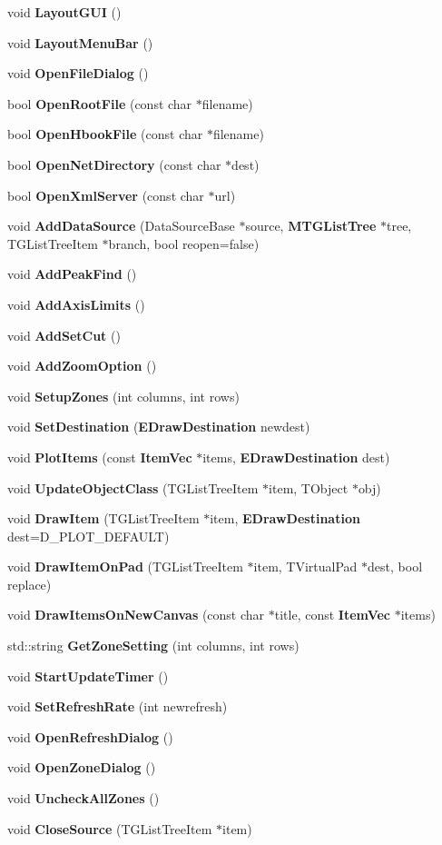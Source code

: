 \begin{DoxyCompactItemize}
\item 
void {\bf LayoutGUI} ()
\item 
void {\bf LayoutMenuBar} ()
\item 
void {\bf OpenFileDialog} ()
\item 
bool {\bf OpenRootFile} (const char $\ast$filename)
\item 
bool {\bf OpenHbookFile} (const char $\ast$filename)
\item 
bool {\bf OpenNetDirectory} (const char $\ast$dest)
\item 
bool {\bf OpenXmlServer} (const char $\ast$url)
\item 
void {\bf AddDataSource} (DataSourceBase $\ast$source, {\bf MTGListTree} $\ast$tree, TGListTreeItem $\ast$branch, bool reopen=false)
\item 
void {\bf AddPeakFind} ()
\item 
void {\bf AddAxisLimits} ()
\item 
void {\bf AddSetCut} ()
\item 
void {\bf AddZoomOption} ()
\item 
void {\bf SetupZones} (int columns, int rows)
\item 
void {\bf SetDestination} ({\bf EDrawDestination} newdest)
\item 
void {\bf PlotItems} (const {\bf ItemVec} $\ast$items, {\bf EDrawDestination} dest)
\item 
void {\bf UpdateObjectClass} (TGListTreeItem $\ast$item, TObject $\ast$obj)
\item 
void {\bf DrawItem} (TGListTreeItem $\ast$item, {\bf EDrawDestination} dest=D\_\-PLOT\_\-DEFAULT)
\item 
void {\bf DrawItemOnPad} (TGListTreeItem $\ast$item, TVirtualPad $\ast$dest, bool replace)
\item 
void {\bf DrawItemsOnNewCanvas} (const char $\ast$title, const {\bf ItemVec} $\ast$items)
\item 
std::string {\bf GetZoneSetting} (int columns, int rows)
\item 
void {\bf StartUpdateTimer} ()
\item 
void {\bf SetRefreshRate} (int newrefresh)
\item 
void {\bf OpenRefreshDialog} ()
\item 
void {\bf OpenZoneDialog} ()
\item 
void {\bf UncheckAllZones} ()
\item 
void {\bf CloseSource} (TGListTreeItem $\ast$item)

\end{DoxyCompactItemize}
